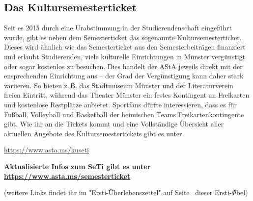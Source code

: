 \begin{multicols*}{2}
\subsection{Das Kultursemesterticket}
Seit es 2015 durch eine Urabstimmung in der Studierendenschaft eingeführt wurde, gibt es neben dem Semesterticket das sogenannte Kultursemesterticket. Dieses wird ähnlich wie das Semesterticket aus den Semesterbeiträgen finanziert und erlaubt Studierenden, viele kulturelle Einrichtungen in Münster vergünstigt oder sogar kostenlos zu besuchen. Dies handelt der AStA jeweils direkt mit der ensprechenden Einrichtung aus – der Grad der Vergünstigung kann daher stark variieren. So bieten z.\,B. das Stadtmuseum Münster und der Literaturverein freien Eintritt, während das Theater Münster ein festes Kontingent an Freikarten und kostenlose Restplätze anbietet. Sportfans dürfte interessieren, dass es für Fußball, Volleyball und Basketball der heimischen Teams Freikartenkontingente gibt. Wie ihr an die Tickets kommt und eine Vollständige Übersicht aller aktuellen Angebote des Kultursemestertickets gibt es unter
\vspace{-1ex}
\begin{center}
	\url{https://www.asta.ms/kuseti}
\end{center}

\smallskip

\begin{center}

	{\bfseries
	Aktualisierte Infos zum SeTi gibt es unter\\
	\url{https://www.asta.ms/semesterticket}}
	
	(weitere Links findet ihr im "Ersti-Überlebenszettel" auf Seite~\pageref{dpü} dieser Ersti-$\Phi$bel)
\end{center}

\end{multicols*}
